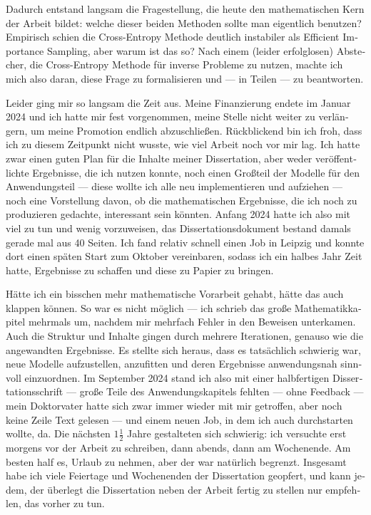 \begin{otherlanguage}{ngerman}
Dadurch entstand langsam die Fragestellung, die heute den mathematischen Kern der Arbeit bildet: welche dieser beiden Methoden sollte man eigentlich benutzen? Empirisch schien die Cross-Entropy Methode deutlich instabiler als Efficient Importance Sampling, aber warum ist das so? Nach einem (leider erfolglosen) Abstecher, die Cross-Entropy Methode für inverse Probleme zu nutzen, machte ich mich also daran, diese Frage zu formalisieren und --- in Teilen --- zu beantworten. 

Leider ging mir so langsam die Zeit aus. Meine Finanzierung endete im Januar 2024 und ich hatte mir fest vorgenommen, meine Stelle nicht weiter zu verlängern, um meine Promotion endlich abzuschließen. Rückblickend bin ich froh, dass ich zu diesem Zeitpunkt nicht wusste, wie viel Arbeit noch vor mir lag. Ich hatte zwar einen guten Plan für die Inhalte meiner Dissertation, aber weder veröffentlichte Ergebnisse, die ich nutzen konnte, noch einen Großteil der Modelle für den Anwendungsteil --- diese wollte ich alle neu implementieren und aufziehen --- noch eine Vorstellung davon, ob die mathematischen Ergebnisse, die ich noch zu produzieren gedachte, interessant sein könnten. Anfang 2024 hatte ich also mit viel zu tun und wenig vorzuweisen, das Dissertationsdokument bestand damals gerade mal aus 40 Seiten. Ich fand relativ schnell einen Job in Leipzig und konnte dort einen späten Start zum Oktober vereinbaren, sodass ich ein halbes Jahr Zeit hatte, Ergebnisse zu schaffen und diese zu Papier zu bringen. 

Hätte ich ein bisschen mehr mathematische Vorarbeit gehabt, hätte das auch klappen können. So war es nicht möglich --- ich schrieb das große Mathematikkapitel mehrmals um, nachdem mir mehrfach Fehler in den Beweisen unterkamen. Auch die Struktur und Inhalte gingen durch mehrere Iterationen, genauso wie die angewandten Ergebnisse. Es stellte sich heraus, dass es tatsächlich schwierig war, neue Modelle aufzustellen, anzufitten und deren Ergebnisse anwendungsnah sinnvoll einzuordnen. Im September 2024 stand ich also mit einer halbfertigen Dissertationsschrift --- große Teile des Anwendungskapitels fehlten --- ohne Feedback --- mein Doktorvater hatte sich zwar immer wieder mit mir getroffen, aber noch keine Zeile Text gelesen --- und einem neuen Job, in dem ich auch durchstarten wollte, da. Die nächsten $1\frac12$ Jahre gestalteten sich schwierig: ich versuchte erst morgens vor der Arbeit zu schreiben, dann abends, dann am Wochenende. Am besten half es, Urlaub zu nehmen, aber der war natürlich begrenzt. Insgesamt habe ich viele Feiertage und Wochenenden der Dissertation geopfert, und kann jedem, der überlegt die Dissertation neben der Arbeit fertig zu stellen nur empfehlen, das vorher zu tun.


\end{otherlanguage}
